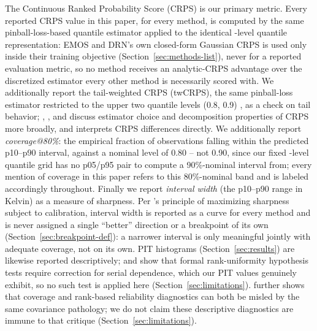 The Continuous Ranked Probability Score (CRPS) is our primary metric.
Every reported CRPS value in this paper, for every method, is computed by
the same pinball-loss-based quantile estimator
\citep{jordan_2017_scoringrules} applied to the identical
\NQuantileLevels{}-level quantile representation: EMOS and DRN's own
closed-form Gaussian CRPS \citep{gneiting_2007_proper_scoring,hersbach_2000_crps}
is used only inside their training objective (Section~\ref{sec:methods-list}),
never for a reported evaluation metric, so no method receives an
analytic-CRPS advantage over the discretized estimator every other method
is necessarily scored with. We additionally report the tail-weighted CRPS
(twCRPS), the same pinball-loss estimator restricted to the upper two
quantile levels (0.8, 0.9) \citep{allen_2023_weighted_scoringrules,taillardat_2019_extremes},
as a check on tail behavior; \citet{zamo_2018_crps_estimation},
\citet{bolin_2019_scale_invariance}, and \citet{arnold_2023_crps_decomposition}
discuss estimator choice and decomposition properties of CRPS more broadly,
and \citet{leutbecher_2020_crps_changes} interprets CRPS differences
directly. We additionally report \emph{coverage@80\%}: the empirical
fraction of observations falling within the predicted p10--p90 interval,
against a nominal level of 0.80 -- not 0.90, since our fixed
\NQuantileLevels{}-level quantile grid has no p05/p95 pair to compute a
90\%-nominal interval from; every mention of coverage in this paper refers
to this 80\%-nominal band and is labeled accordingly throughout. Finally we
report \emph{interval width} (the p10--p90 range in Kelvin) as a measure of
sharpness. Per \citet{gneiting_2007_calibration_sharpness}'s principle of
maximizing sharpness subject to calibration, interval width is reported as a
curve for every method and is never assigned a single ``better'' direction
or a breakpoint of its own (Section~\ref{sec:breakpoint-def}): a narrower
interval is only meaningful jointly with adequate coverage, not on its own.
PIT histograms (Section~\ref{sec:results}) are likewise reported
descriptively; \citet{broecker_2018_serial_dependence} and
\citet{broecker_2020_stratified_rank} show that formal rank-uniformity
hypothesis tests require correction for serial dependence, which our PIT
values genuinely exhibit, so no such test is applied here
(Section~\ref{sec:limitations}). \citet{dirkson_2025_misdiagnosing_reliability}
further shows that coverage and rank-based reliability diagnostics can both
be misled by the same covariance pathology; we do not claim these
descriptive diagnostics are immune to that critique (Section~\ref{sec:limitations}).

